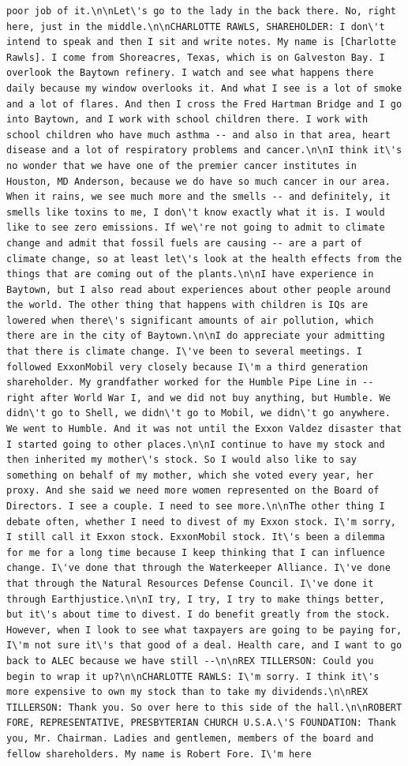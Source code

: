 \documentclass[
  letterpaper,
  DIV=11,
  numbers=noendperiod]{scrreprt}
\begin{document}
\begin{verbatim}
poor job of it.\n\nLet\'s go to the lady in the back there. No, right here, just in the middle.\n\nCHARLOTTE RAWLS, SHAREHOLDER: I don\'t intend to speak and then I sit and write notes. My name is [Charlotte Rawls]. I come from Shoreacres, Texas, which is on Galveston Bay. I overlook the Baytown refinery. I watch and see what happens there daily because my window overlooks it. And what I see is a lot of smoke and a lot of flares. And then I cross the Fred Hartman Bridge and I go into Baytown, and I work with school children there. I work with school children who have much asthma -- and also in that area, heart disease and a lot of respiratory problems and cancer.\n\nI think it\'s no wonder that we have one of the premier cancer institutes in Houston, MD Anderson, because we do have so much cancer in our area. When it rains, we see much more and the smells -- and definitely, it smells like toxins to me, I don\'t know exactly what it is. I would like to see zero emissions. If we\'re not going to admit to climate change and admit that fossil fuels are causing -- are a part of climate change, so at least let\'s look at the health effects from the things that are coming out of the plants.\n\nI have experience in Baytown, but I also read about experiences about other people around the world. The other thing that happens with children is IQs are lowered when there\'s significant amounts of air pollution, which there are in the city of Baytown.\n\nI do appreciate your admitting that there is climate change. I\'ve been to several meetings. I followed ExxonMobil very closely because I\'m a third generation shareholder. My grandfather worked for the Humble Pipe Line in -- right after World War I, and we did not buy anything, but Humble. We didn\'t go to Shell, we didn\'t go to Mobil, we didn\'t go anywhere. We went to Humble. And it was not until the Exxon Valdez disaster that I started going to other places.\n\nI continue to have my stock and then inherited my mother\'s stock. So I would also like to say something on behalf of my mother, which she voted every year, her proxy. And she said we need more women represented on the Board of Directors. I see a couple. I need to see more.\n\nThe other thing I debate often, whether I need to divest of my Exxon stock. I\'m sorry, I still call it Exxon stock. ExxonMobil stock. It\'s been a dilemma for me for a long time because I keep thinking that I can influence change. I\'ve done that through the Waterkeeper Alliance. I\'ve done that through the Natural Resources Defense Council. I\'ve done it through Earthjustice.\n\nI try, I try, I try to make things better, but it\'s about time to divest. I do benefit greatly from the stock. However, when I look to see what taxpayers are going to be paying for, I\'m not sure it\'s that good of a deal. Health care, and I want to go back to ALEC because we have still --\n\nREX TILLERSON: Could you begin to wrap it up?\n\nCHARLOTTE RAWLS: I\'m sorry. I think it\'s more expensive to own my stock than to take my dividends.\n\nREX TILLERSON: Thank you. So over here to this side of the hall.\n\nROBERT FORE, REPRESENTATIVE, PRESBYTERIAN CHURCH U.S.A.\'S FOUNDATION: Thank you, Mr. Chairman. Ladies and gentlemen, members of the board and fellow shareholders. My name is Robert Fore. I\'m here 
\end{verbatim}
\end{document}
